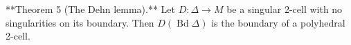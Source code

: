 **Theorem 5 (The Dehn lemma).** Let $D: \Delta \to M$ be a singular 2-cell with no singularities on its boundary. Then $D(\operatorname{Bd} \Delta)$ is the boundary of a polyhedral 2-cell.
